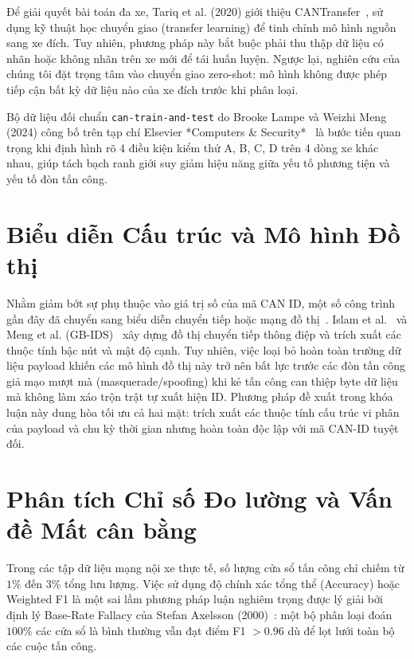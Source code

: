 \documentclass[12pt, a4paper, reqno, oneside]{book}
\begin{document}
Để giải quyết bài toán đa xe, Tariq et al. (2020) giới thiệu CANTransfer~\cite{tariq2020cantransfer}, sử dụng kỹ thuật học chuyển giao (transfer learning) để tinh chỉnh mô hình nguồn sang xe đích. Tuy nhiên, phương pháp này bắt buộc phải thu thập dữ liệu có nhãn hoặc không nhãn trên xe mới để tái huấn luyện. Ngược lại, nghiên cứu của chúng tôi đặt trọng tâm vào chuyển giao zero-shot: mô hình không được phép tiếp cận bất kỳ dữ liệu nào của xe đích trước khi phân loại.

Bộ dữ liệu đối chuẩn \texttt{can-train-and-test} do Brooke Lampe và Weizhi Meng (2024) công bố trên tạp chí Elsevier *Computers \& Security*~\cite{lampe2024curated,LAMPE2024103777} là bước tiến quan trọng khi định hình rõ 4 điều kiện kiểm thử A, B, C, D trên 4 dòng xe khác nhau, giúp tách bạch ranh giới suy giảm hiệu năng giữa yếu tố phương tiện và yếu tố đòn tấn công.

\section{Biểu diễn Cấu trúc và Mô hình Đồ thị}
\label{sec:rw_structural}

Nhằm giảm bớt sự phụ thuộc vào giá trị số của mã CAN ID, một số công trình gần đây đã chuyển sang biểu diễn chuyển tiếp hoặc mạng đồ thị~\cite{islam2020graph,meng2023gbids,islam2021ggnb,khreasat2026relational}. Islam et al.~\cite{islam2020graph} và Meng et al. (GB-IDS)~\cite{meng2023gbids} xây dựng đồ thị chuyển tiếp thông điệp và trích xuất các thuộc tính bậc nút và mật độ cạnh. Tuy nhiên, việc loại bỏ hoàn toàn trường dữ liệu payload khiến các mô hình đồ thị này trở nên bất lực trước các đòn tấn công giả mạo mượt mà (masquerade/spoofing) khi kẻ tấn công can thiệp byte dữ liệu mà không làm xáo trộn trật tự xuất hiện ID. Phương pháp đề xuất trong khóa luận này dung hòa tối ưu cả hai mặt: trích xuất các thuộc tính cấu trúc vi phân của payload và chu kỳ thời gian nhưng hoàn toàn độc lập với mã CAN-ID tuyệt đối.

\section{Phân tích Chỉ số Đo lường và Vấn đề Mất cân bằng}
\label{sec:rw_metrics}

Trong các tập dữ liệu mạng nội xe thực tế, số lượng cửa sổ tấn công chỉ chiếm từ $1\%$ đến $3\%$ tổng lưu lượng. Việc sử dụng độ chính xác tổng thể (Accuracy) hoặc Weighted F1 là một sai lầm phương pháp luận nghiêm trọng được lý giải bởi định lý Base-Rate Fallacy của Stefan Axelsson (2000)~\cite{axelsson2000base}: một bộ phân loại đoán $100\%$ các cửa sổ là bình thường vẫn đạt điểm F1 $>0.96$ dù để lọt lưới toàn bộ các cuộc tấn công. 
\end{document}
